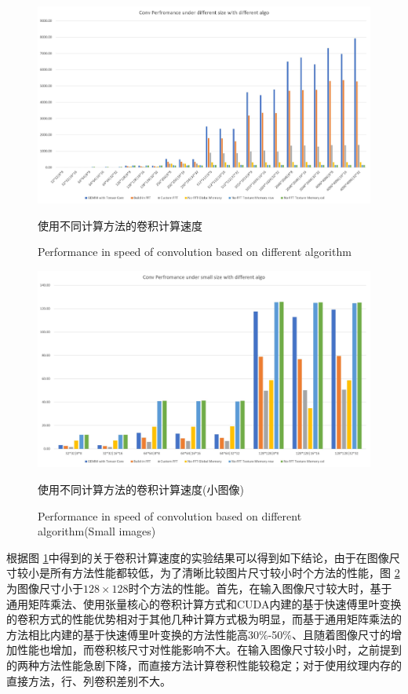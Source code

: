 \begin{figure}
	\centering
	\includegraphics[width=15cm]{figures/CONVPerf.jpg}
	\renewcommand{\thefigure}{\arabic{section}-\arabic{figure} }
	\renewcommand{\figurename}{图}
	\caption{使用不同计算方法的卷积计算速度}
	\addtocounter{figure}{-1}
	\renewcommand{\thefigure}{\arabic{section}-\arabic{figure} }
	\renewcommand{\figurename}{Figure}
	\caption{Performance in speed of convolution based on different algorithm}
	\label{Fig.CONVPerf}
\end{figure}
\begin{figure}
	\centering
	\includegraphics[width=15cm]{figures/CONVSubPerf.jpg}
	\renewcommand{\thefigure}{\arabic{section}-\arabic{figure} }
	\renewcommand{\figurename}{图}
	\caption{使用不同计算方法的卷积计算速度(小图像)}
	\addtocounter{figure}{-1}
	\renewcommand{\thefigure}{\arabic{section}-\arabic{figure} }
	\renewcommand{\figurename}{Figure}
	\caption{Performance in speed of convolution based on different algorithm(Small images)}
	\label{Fig.CONVSubPerf}
\end{figure}
\par 根据图 \ref{Fig.CONVPerf}中得到的关于卷积计算速度的实验结果可以得到如下结论，由于在图像尺寸较小是所有方法性能都较低，为了清晰比较图片尺寸较小时个方法的性能，图 \ref{Fig.CONVSubPerf}为图像尺寸小于$ 128\times 128 $时个方法的性能。首先，在输入图像尺寸较大时，基于通用矩阵乘法、使用张量核心的卷积计算方式和CUDA内建的基于快速傅里叶变换的卷积方式的性能优势相对于其他几种计算方式极为明显，而基于通用矩阵乘法的方法相比内建的基于快速傅里叶变换的方法性能高30\%-50\%、且随着图像尺寸的增加性能也增加，而卷积核尺寸对性能影响不大。在输入图像尺寸较小时，之前提到的两种方法性能急剧下降，而直接方法计算卷积性能较稳定；对于使用纹理内存的直接方法，行、列卷积差别不大。
